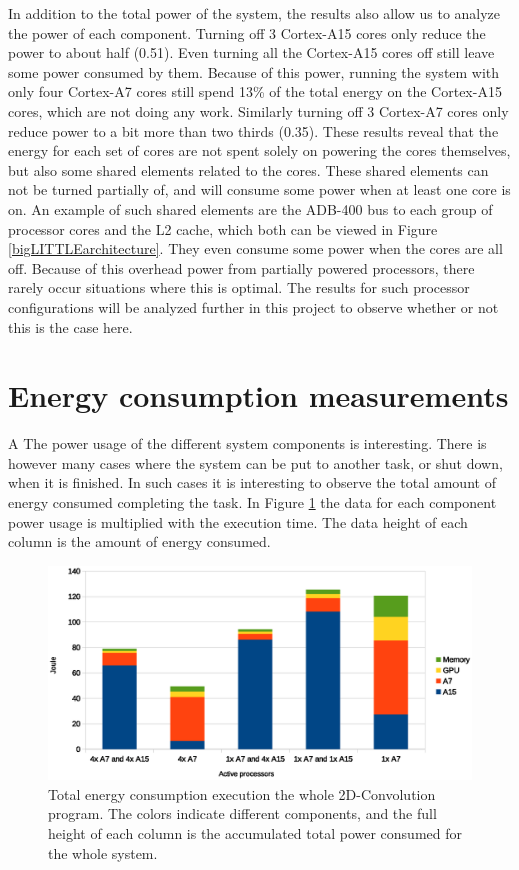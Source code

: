 In addition to the total power of the system, the results also allow us to analyze the power of each component.
Turning off 3 Cortex-A15 cores only reduce the power to about half (0.51).
Even turning all the Cortex-A15 cores off still leave some power consumed by them.
Because of this power, running the system with only four Cortex-A7 cores still spend 13\% of the total energy on the Cortex-A15 cores, which are not doing any work.
Similarly turning off 3 Cortex-A7 cores only reduce power to a bit more than two thirds (0.35).
These results reveal that the energy for each set of cores are not spent solely on powering the cores themselves, but also some shared elements related to the cores.
These shared elements can not be turned partially of, and will consume some power when at least one core is on.
An example of such shared elements are the ADB-400 bus to each group of processor cores and the L2 cache, which both can be viewed in Figure \ref{bigLITTLEarchitecture}.
They even consume some power when the cores are all off.
Because of this overhead power from partially powered processors, there rarely occur situations where this is optimal.
The results for such processor configurations will be analyzed further in this project to observe whether or not this is the case here.

\section{Energy consumption measurements}A \label{energyconsumptionmeasurements}
The power usage of the different system components is interesting.
There is however many cases where the system can be put to another task, or shut down, when it is finished.
In such cases it is interesting to observe the total amount of energy consumed completing the task.
In Figure \ref{power-consumed-configurations} the data for each component power usage is multiplied with the execution time.
The data height of each column is the amount of energy consumed.

\begin{figure}[H]
  \centering
  \includegraphics[width=160mm]{fig/power-consumed-configurations.eps}
  \caption{Total energy consumption execution the whole 2D-Convolution program. The colors indicate different components, and the full height of each column is the accumulated total power consumed for the whole system.\label{overflow}} \label {power-consumed-configurations}
\end{figure}

